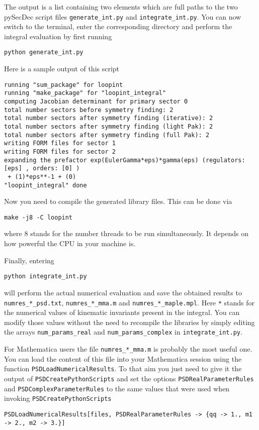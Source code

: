 \documentclass[../FeynHelpersManual.tex]{subfiles}
\begin{document}
The output is a list containing two elements which are full paths to the
two pySecDec script files \texttt{generate_int.py} and
\texttt{integrate_int.py}. You can now switch to the terminal, enter the
corresponding directory and perform the integral evaluation by first
running

\begin{verbatim}
python generate_int.py
\end{verbatim}

Here is a sample output of this script

\begin{verbatim}
running "sum_package" for loopint
running "make_package" for "loopint_integral"
computing Jacobian determinant for primary sector 0
total number sectors before symmetry finding: 2
total number sectors after symmetry finding (iterative): 2
total number sectors after symmetry finding (light Pak): 2
total number sectors after symmetry finding (full Pak): 2
writing FORM files for sector 1
writing FORM files for sector 2
expanding the prefactor exp(EulerGamma*eps)*gamma(eps) (regulators: [eps] , orders: [0] )
 + (1)*eps**-1 + (0)
"loopint_integral" done
\end{verbatim}

Now you need to compile the generated library files. This can be done
via

\begin{verbatim}
make -j8 -C loopint
\end{verbatim}

where 8 stands for the number threads to be run simultaneously. It
depends on how powerful the CPU in your machine is.

Finally, entering

\begin{verbatim}
python integrate_int.py
\end{verbatim}

will perform the actual numerical evaluation and save the obtained
results to \texttt{numres_*_psd.txt}, \texttt{numres_*_mma.m} and
\texttt{numres_*_maple.mpl}. Here \texttt{*} stands for the numerical
values of kinematic invariants present in the integral. You can modify
those values without the need to recompile the libraries by simply
editing the arrays \texttt{num_params_real} and
\texttt{num_params_complex} in \texttt{integrate_int.py}.

For Mathematica users the file \texttt{numres_*_mma.m} is probably the
most useful one. You can load the content of this file into your
Mathematica session using the function \texttt{PSDLoadNumericalResults}.
To that aim you just need to give it the output of
\texttt{PSDCreatePythonScripts} and set the options
\texttt{PSDRealParameterRules} and \texttt{PSDComplexParameterRules} to
the same values that were used when invoking
\texttt{PSDCreatePythonScripts}

\begin{verbatim}
PSDLoadNumericalResults[files, PSDRealParameterRules -> {qq -> 1., m1 -> 2., m2 -> 3.}]
\end{verbatim}
\end{document}
